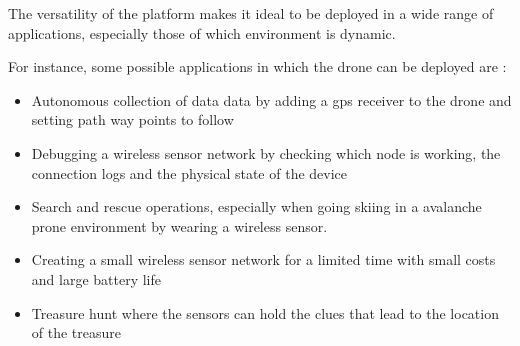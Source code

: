 \label{chap:future}

The versatility of the platform makes it ideal to be deployed in a wide range of applications, especially those of which environment is dynamic.

For instance, some possible applications in which the drone can be deployed are  \cite{arampatzis2005survey}:

 \begin{itemize} 

\item  Autonomous collection of data data by adding a gps receiver to the drone and setting path way points to follow

\item Debugging a wireless sensor network by checking which node is working, the connection logs and the physical state of the device

\item Search and rescue operations, especially when going skiing in a avalanche prone environment by wearing a wireless sensor. 

\item Creating a small wireless sensor network for a limited time with small costs and large battery life

\item Treasure hunt where the sensors can hold the clues that lead to the location of the treasure

 
\end{itemize}

